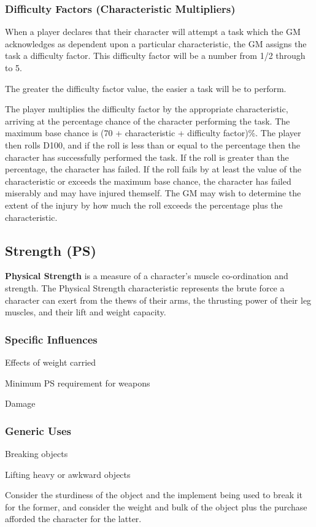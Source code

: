\begin{multicols*}{3}
\subsubsection{Difficulty Factors (Characteristic Multipliers)}

When a player declares that their character will attempt a task which
the GM acknowledges as dependent upon a particular characteristic, the
GM assigns the task a difficulty factor. This difficulty factor will
be a number from 1/2 through to 5.

The greater the difficulty factor value, the easier a task will be to
perform.

The player multiplies the difficulty factor by the appropriate
characteristic, arriving at the percentage chance of the character
performing the task.  The maximum base chance is (70 + characteristic
+ difficulty factor)\%.  The player then rolls D100, and if the roll
is less than or equal to the percentage then the character has
successfully performed the task. If the roll is greater than the
percentage, the character has failed. If the roll fails by at least
the value of the characteristic or exceeds the maximum base chance,
the character has failed miserably and may have injured themself. The
GM may wish to determine the extent of the injury by how much the roll
exceeds the percentage plus the characteristic.

\subsection{Strength (PS)}

\textbf{Physical Strength} is a measure of a character's muscle
co-ordination and strength.  The Physical Strength characteristic
represents the brute force a character can exert from the thews of
their arms, the thrusting power of their leg muscles, and their lift
and weight capacity.

\subsubsection{Specific Influences}
\begin{Itemize}
\item Effects of weight carried
\item Minimum PS requirement for weapons
\item Damage
\end{Itemize}
\subsubsection{Generic Uses}
\begin{Itemize}
\item Breaking objects
\item Lifting heavy or awkward objects
\end{Itemize}
\begin{example}
Consider the sturdiness of the object and the implement being used to
break it for the former, and consider the weight and bulk of the
object plus the purchase afforded the character for the latter.
\end{example}


\end{multicols*}
